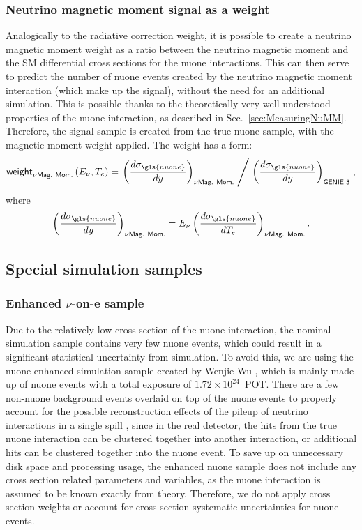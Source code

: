 \subsubsection*{Neutrino magnetic moment signal as a weight}
Analogically to the radiative correction weight, it is possible to create a neutrino magnetic moment weight as a ratio between the neutrino magnetic moment and the \gls{SM} differential cross sections for the \gls{nuone} interactions. This can then serve to predict the number of \gls{nuone} events created by the neutrino magnetic moment interaction (which make up the signal), without the need for an additional simulation. This is possible thanks to the theoretically very well understood properties of the \gls{nuone} interaction, as described in Sec.~\ref{sec:MeasuringNuMM}. Therefore, the signal sample is created from the true \gls{nuone} sample, with the magnetic moment weight applied. The weight has a form:
\begin{equation}
\textsf{weight}_{\nu \textsf{Mag. Mom.}}\left(E_\nu,T_e\right) = \left.\left(\frac{d\sigma_{\gls{nuone}}}{dy}\right)_{\nu \textsf{Mag. Mom.}}\; \middle/\; \left(\frac{d\sigma_{\gls{nuone}}}{dy}\right)_{\textsf{GENIE 3}}\right.,
\end{equation}
where
\begin{equation}
\left(\frac{d\sigma_{\gls{nuone}}}{dy}\right)_{\nu \textsf{Mag. Mom.}} = E_\nu \left(\frac{d\sigma_{\gls{nuone}}}{dT_e}\right)_{\nu \textsf{Mag. Mom.}}.
\end{equation}

\subsection{Special simulation samples}
\subsubsection*{Enhanced $\nu$-on-e sample}
Due to the relatively low cross section of the \gls{nuone} interaction, the nominal simulation sample contains very few \gls{nuone} events, which could result in a significant statistical uncertainty from simulation. To avoid this, we are using the \gls{nuone}-enhanced simulation sample created by Wenjie Wu \cite{NOVA-doc-56383}, which is mainly made up of \gls{nuone} events with a total exposure of $1.72\times10^{24}$~\gls{POT}. There are a few non-\gls{nuone} background events overlaid on top of the \gls{nuone} events to properly account for the possible reconstruction effects of the pileup of neutrino interactions in a single spill \cite{NOVA-doc-56383}, since in the real detector, the hits from the true \gls{nuone} interaction can be clustered together into another interaction, or additional hits can be clustered together into the \gls{nuone} event. To save up on unnecessary disk space and processing usage, the enhanced \gls{nuone} sample does not include any cross section related parameters and variables, as the \gls{nuone} interaction is assumed to be known exactly from theory. Therefore, we do not apply cross section weights or account for cross section systematic uncertainties for \gls{nuone} events.

